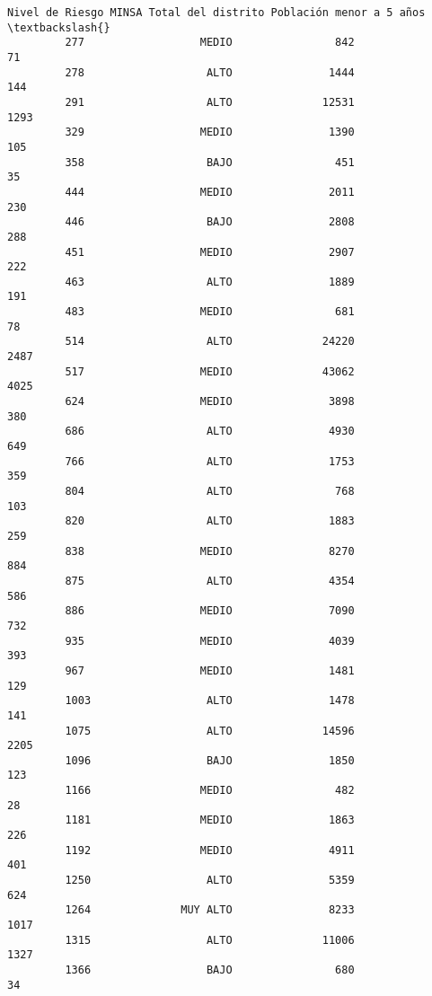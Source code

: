 \documentclass[11pt]{article}
\begin{document}
\begin{Verbatim}[commandchars=\\\{\}]
              Nivel de Riesgo MINSA Total del distrito Población menor a 5 años  \textbackslash{}
         277                  MEDIO                842                       71   
         278                   ALTO               1444                      144   
         291                   ALTO              12531                     1293   
         329                  MEDIO               1390                      105   
         358                   BAJO                451                       35   
         444                  MEDIO               2011                      230   
         446                   BAJO               2808                      288   
         451                  MEDIO               2907                      222   
         463                   ALTO               1889                      191   
         483                  MEDIO                681                       78   
         514                   ALTO              24220                     2487   
         517                  MEDIO              43062                     4025   
         624                  MEDIO               3898                      380   
         686                   ALTO               4930                      649   
         766                   ALTO               1753                      359   
         804                   ALTO                768                      103   
         820                   ALTO               1883                      259   
         838                  MEDIO               8270                      884   
         875                   ALTO               4354                      586   
         886                  MEDIO               7090                      732   
         935                  MEDIO               4039                      393   
         967                  MEDIO               1481                      129   
         1003                  ALTO               1478                      141   
         1075                  ALTO              14596                     2205   
         1096                  BAJO               1850                      123   
         1166                 MEDIO                482                       28   
         1181                 MEDIO               1863                      226   
         1192                 MEDIO               4911                      401   
         1250                  ALTO               5359                      624   
         1264              MUY ALTO               8233                     1017   
         1315                  ALTO              11006                     1327   
         1366                  BAJO                680                       34   
         

\end{Verbatim}
\end{document}
